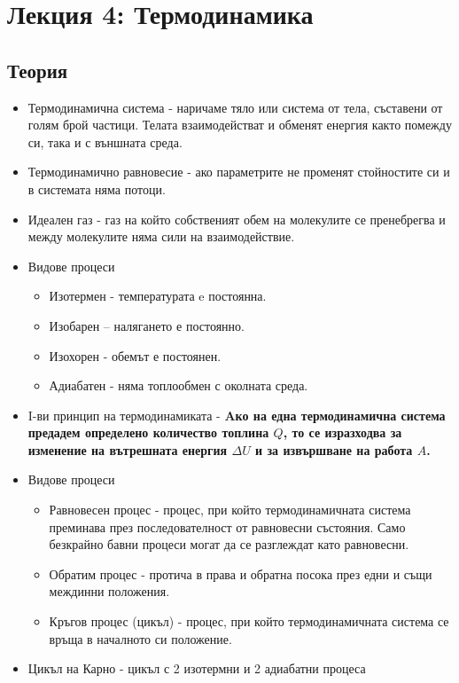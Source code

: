 \documentclass[fleqn, 12pt]{article}
\theoremstyle{definition}
\begin{document}
\newpage
\section{Лекция 4: Термодинамика}

\subsection{Теория}

\begin{itemize}
\item Термодинамична система - наричаме тяло или система от тела,
съставени от голям брой частици. Телата взаимодействат и обменят енергия както
помежду си, така и с външната среда.
\item Термодинамично равновесие - ако параметрите не променят стойностите си и в системата няма потоци. 
\item Идеален газ - газ на който собственият обем на молекулите се пренебрегва и между молекулите няма сили на взаимодействие.
\item Видове процеси
\begin{itemize}
\item Изотермен - температурата e постоянна.
\item Изобарен – налягането е постоянно.
\item Изохорен - обемът е постоянен.
\item Адиабатен - няма топлообмен с околната среда.
\end{itemize}
\item I-ви принцип на термодинамиката - \textbf{Aко на една
термодинамична система предадем определено количество топлина
$Q $, то се изразходва за изменение на вътрешната енергия
$\Delta U$ и за извършване на работа $A$.}
\item Видове процеси
\begin{itemize}
\item Равновесен процес - процес, при който термодинамичната система 
преминава през последователност от равновесни състояния. Само безкрайно бавни процеси могат да се разглеждат като равновесни.
\item Обратим процес - протича в права и обратна посока през едни и
същи междинни положения.
\item Кръгов процес (цикъл) - процес, при който
термодинамичната система се връща в началното си
положение.
\end{itemize}
\item Цикъл на Карно - цикъл с 2 изотермни и 2 адиабатни процеса

\end{itemize}
\end{document}
